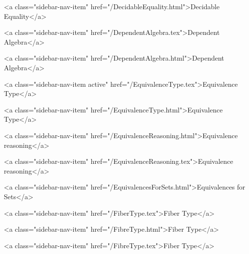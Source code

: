       
    
      
        
          <a class="sidebar-nav-item" href="/DecidableEquality.html">Decidable Equality</a>
        
      
    
      
        
          <a class="sidebar-nav-item" href="/DependentAlgebra.tex">Dependent Algebra</a>
        
      
    
      
        
          <a class="sidebar-nav-item" href="/DependentAlgebra.html">Dependent Algebra</a>
        
      
    
      
        
          <a class="sidebar-nav-item active" href="/EquivalenceType.tex">Equivalence Type</a>
        
      
    
      
        
          <a class="sidebar-nav-item" href="/EquivalenceType.html">Equivalence Type</a>
        
      
    
      
        
          <a class="sidebar-nav-item" href="/EquivalenceReasoning.html">Equivalence reasoning</a>
        
      
    
      
        
          <a class="sidebar-nav-item" href="/EquivalenceReasoning.tex">Equivalence reasoning</a>
        
      
    
      
        
          <a class="sidebar-nav-item" href="/EquivalencesForSets.html">Equivalences for Sets</a>
        
      
    
      
        
          <a class="sidebar-nav-item" href="/FiberType.tex">Fiber Type</a>
        
      
    
      
        
          <a class="sidebar-nav-item" href="/FibreType.html">Fiber Type</a>
        
      
    
      
        
          <a class="sidebar-nav-item" href="/FibreType.tex">Fiber Type</a>
        
